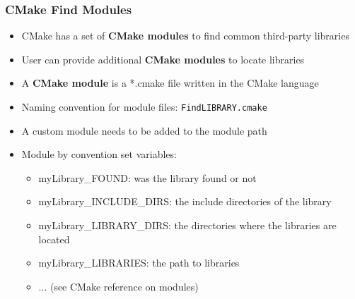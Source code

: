 \begin{frame}
  \frametitle{CMake Find Modules}

    \begin{itemize}
      \item CMake has a set of \textbf{CMake modules} to find common third-party libraries
      \item User can provide additional \textbf{CMake modules} to locate libraries 
      \item A \textbf{CMake module} is a *.cmake file written in the CMake language 
      \item Naming convention for module files: \texttt{FindLIBRARY.cmake} 
      \item A custom module needs to be added to the module path 
      \item Module by convention set variables:
    \begin{itemize}
      \item myLibrary\_FOUND: was the library found or not 
      \item myLibrary\_INCLUDE\_DIRS: the include directories of the library  
      \item myLibrary\_LIBRARY\_DIRS: the directories where the libraries are located  
      \item myLibrary\_LIBRARIES: the path to libraries  
      \item ... (see CMake reference on modules)  
    \end{itemize}
    \end{itemize}

\end{frame}

